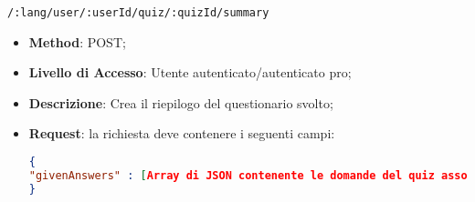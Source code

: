 	
	\item \texttt{/:lang/user/:userId/quiz/:quizId/summary}
	\begin{itemize}
		\item \textbf{Method}: POST;
		\item \textbf{Livello di Accesso}: Utente autenticato/autenticato pro;
		\item \textbf{Descrizione}: Crea il riepilogo del questionario svolto;
		\item \textbf{Request}: la richiesta deve contenere i seguenti campi:
\begin{lstlisting}[language=json,firstnumber=1]
{
"givenAnswers" : [Array di JSON contenente le domande del quiz associate alle risposte date dall'utente]
}
\end{lstlisting}
	\end{itemize}